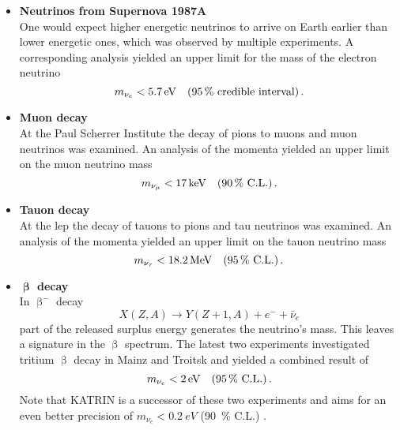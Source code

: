     \begin{itemize}
    \renewcommand{\labelitemi}{$\bullet$}
        \item \textbf{Neutrinos from Supernova 1987A}\\ 
        One would expect higher energetic neutrinos to arrive on Earth earlier than lower energetic ones, which was observed by multiple experiments. A corresponding analysis yielded an upper limit for the mass of the electron neutrino \cite{Loredo2002}
        \begin{equation*}
            m_{\nu_e} < \SI{5.7}{eV} \quad (\SI{95}{\percent} \text{ credible interval}) \text{\,.} 
        \end{equation*}
        \item \textbf{Muon decay}\\ 
        At the Paul Scherrer Institute the decay of pions to muons and muon neutrinos was examined. An analysis of the momenta yielded an upper limit on the muon neutrino mass \cite{Assamagan1996}
        \begin{equation*}
            m_{\nu_\mu} < \SI{17}{keV} \quad (\SI{90}{\percent} \text{ C.L.}) \text{\,.} 
        \end{equation*}
        \item \textbf{Tauon decay}\\ 
        At the \gls{lep} the decay of tauons to pions and tau neutrinos was examined. An analysis of the momenta yielded an upper limit on the tauon neutrino mass \cite{Barate:1997zg}
        \begin{equation*}
            m_{\nu_\tau} < \SI{18.2}{MeV} \quad (\SI{95}{\percent} \text{ C.L.}) \text{\,.} 
        \end{equation*}
        \item \textbf{$\boldsymbol{\upbeta}$ decay}\\ 
        In $\upbeta^-$ decay
        \begin{equation}
            X(Z,A) \rightarrow Y(Z+1,A) + e^- + \bar{\nu}_e
        \end{equation}
        part of the released surplus energy generates the neutrino's mass. This leaves a signature in the $\upbeta$ spectrum. The latest two experiments investigated tritium $\upbeta$ decay in Mainz and Troitsk and yielded a combined result of \cite{Kraus2005, Aseev:2011dq, ReviewOfParticlePhysics}
        \begin{equation*}
            m_{\nu_e} < \SI{2}{eV} \quad (\SI{95}{\percent} \text{ C.L.}) \text{\,.} 
        \end{equation*}
        Note that KATRIN is a successor of these two experiments and aims for an even better precision of $m_{\nu_e} < \SI{0.2}{eV}$ (\SI{90}{\percent} C.L.) \cite{Angrik:2005ep}.
    \end{itemize}
    